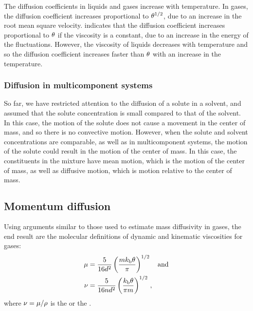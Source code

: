 The diffusion coefficients in liquids and gases increase with temperature. In gases, the diffusion coefficient increases proportional to $\theta^{1/2}$, due to an increase in the root mean square velocity.  indicates that the diffusion coefficient increases proportional to $\theta$ if the viscosity is a constant, due to an increase in the energy of the fluctuations. However, the viscosity of liquids decreases with temperature and so the diffusion coefficient increases faster than $\theta$ with an increase in the temperature.


\subsubsection{Diffusion in multicomponent systems}
So far, we have restricted attention to the diffusion of a solute in a solvent, and assumed that the solute concentration is small compared to that of the solvent. In this case, the motion of the solute does not cause a movement in the center of mass, and so there is no convective motion. However, when the solute and solvent concentrations are comparable, as well as in multicomponent systems, the motion of the solute could result in the motion of the center of mass. In this case, the constituents in the mixture have mean motion, which is the motion of the center of mass, as well as diffusive motion, which is motion relative to the center of mass.


\subsection{Momentum diffusion}
Using arguments similar to those used to estimate mass diffusivity in gases, the end result are the molecular definitions of dynamic and kinematic viscosities for gases:
\begin{subequations}\label{eq:dynandkinviscositiesforgases}
\begin{align}
\mu &= \dfrac{5}{16d^2}\left(\dfrac{mk_\text{b}\theta}{\pi}\right)^{1/2}\quad\text{and}\\
\nu &= \dfrac{5}{16nd^2}\left(\dfrac{k_\text{b}\theta}{\pi m}\right)^{1/2}\,,
\end{align}
\end{subequations}
where $\nu = \mu/\rho$ is the  or the .

